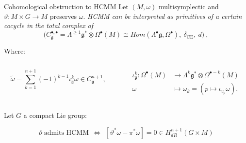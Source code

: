 \documentclass[handout,10pt]{beamer}
\begin{document}
\begin{frame}[fragile]{Cohomological obstruction to HCMM}
	Let $(M,\omega)$ multisymplectic and $\vartheta: M \times G \to M$ preserves $\omega$. 
	\vfill
	\emph{HCMM can be interpreted as primitives of a certain cocycle in the total complex of}
	\vspace{-.5em}
	\begin{displaymath}
		\Big(C_\mathfrak{g}^{\bullet,\bullet} = \Lambda^{\geq 1} 
		\mathfrak{g}^*\otimes \Omega^\bullet(M) 
		\cong Hom(\Lambda^\bullet \mathfrak{g},\Omega^\bullet),~\delta_\text{CE},~d\Big)
		~,	
	\end{displaymath}
	\vfill
	\pause
	\begin{propblock}[$\vartheta ~\text{admits HCMM}~ ~\Longleftrightarrow~ \lbrack\tilde{\omega}\rbrack=0\in H^{n+1}(C_\mathfrak g^\bullet,d_ {tot})$	
	]
		Where:
		\begin{columns}
		\begin{column}{.5\textwidth}
			\begin{displaymath}
				\tilde{\omega} = \sum_{k=1}^{n+1} (-1)^{k-1} \iota^k_\mathfrak{g} \omega \in C_\mathfrak{g}^{n+1},
			\end{displaymath}		
		\end{column}
		\begin{column}{.5\textwidth}
			\begin{align*}
				\iota^k_\mathfrak{g} \colon \Omega^\bullet(M)
				&\to \Lambda^k \mathfrak{g}^\ast \otimes \Omega^{\bullet-k}(M)
				\\ \omega&\mapsto \omega_k = 
				\left(p \mapsto \iota_{v_p} \omega  \right) ,
			\end{align*}
		\end{column}		
		\end{columns} 
	\end{propblock}
	\pause
	\vfill
	Let $G$ a compact Lie group:
	\begin{thmblock}[MR19]
	$$\vartheta ~\text{admits HCMM}~ ~\Longleftrightarrow~  
	 ~[\vartheta^*\omega-\pi^*\omega]=0\in H^{n+1}_{dR}(G\times M)$$ 
	\end{thmblock}


\end{frame}
\end{document}
